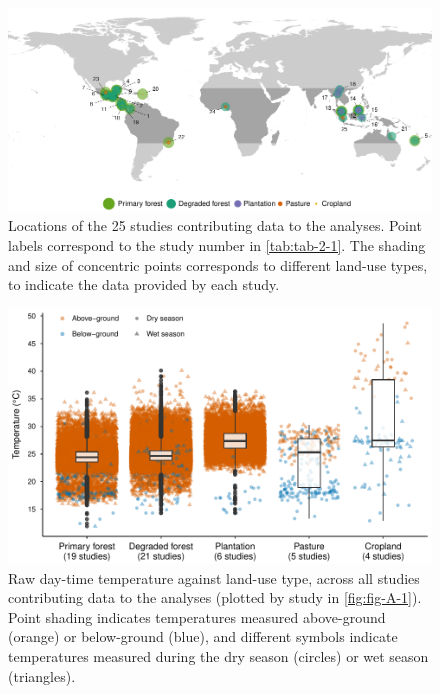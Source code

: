 \documentclass[12pt,a4paper,]{report}
\theoremstyle{definition}
\theoremstyle{definition}
\theoremstyle{definition}
\theoremstyle{remark}
\begin{document}
\begin{figure}

{\centering \includegraphics{./output/fig-2-1-1} 

}

\caption{Locations of the 25 studies contributing data to the
analyses. Point labels correspond to the study number in
\autoref{tab:tab-2-1}. The shading and size of concentric points
corresponds to different land-use types, to indicate the data provided
by each study.}\label{fig:fig-2-1}
\end{figure}








\begin{figure}
\includegraphics{./output/fig-2-2-1} \caption{Raw day-time temperature against land-use type, across all
studies contributing data to the analyses (plotted by study in
\autoref{fig:fig-A-1}). Point shading indicates temperatures measured
above-ground (orange) or below-ground (blue), and different symbols
indicate temperatures measured during the dry season (circles) or wet
season (triangles).}\label{fig:fig-2-2}
\end{figure}
\end{document}

